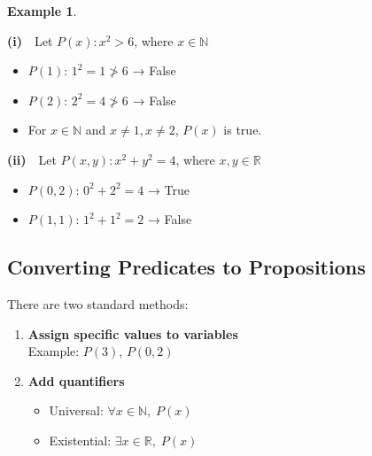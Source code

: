 \documentclass[
]{book}
\providecommand{\tightlist}{%
  \setlength{\itemsep}{0pt}\setlength{\parskip}{0pt}}
\theoremstyle{definition}
\theoremstyle{definition}
\newtheorem{example}{Example}[chapter]
\theoremstyle{definition}
\theoremstyle{definition}
\theoremstyle{remark}
\begin{document}
\begin{example}
\protect\hypertarget{exm:unnamed-chunk-43}{}\label{exm:unnamed-chunk-43}

\textbf{(i)} Let \(P(x): x^2 > 6\), where \(x \in \mathbb{N}\)

\begin{itemize}
\tightlist
\item
  \(P(1)\): \(1^2 = 1 \not> 6\) → False\\
\item
  \(P(2)\): \(2^2 = 4 \not> 6\) → False\\
\item
  For \(x \in \mathbb{N}\) and \(x \ne 1, x \ne 2\), \(P(x)\) is true.
\end{itemize}

\textbf{(ii)} Let \(P(x, y): x^2 + y^2 = 4\), where \(x, y \in \mathbb{R}\)

\begin{itemize}
\tightlist
\item
  \(P(0, 2)\): \(0^2 + 2^2 = 4\) → True\\
\item
  \(P(1, 1)\): \(1^2 + 1^2 = 2\) → False
\end{itemize}

\end{example}

\subsection{Converting Predicates to Propositions}\label{converting-predicates-to-propositions}

There are two standard methods:

\begin{enumerate}
\def\labelenumi{\arabic{enumi}.}
\item
  \textbf{Assign specific values to variables}\\
  Example: \(P(3)\), \(P(0, 2)\)
\item
  \textbf{Add quantifiers}

  \begin{itemize}
  \tightlist
  \item
    Universal: \(\forall x \in \mathbb{N},\; P(x)\)\\
  \item
    Existential: \(\exists x \in \mathbb{R},\; P(x)\)
  \end{itemize}
\end{enumerate}
\end{document}
